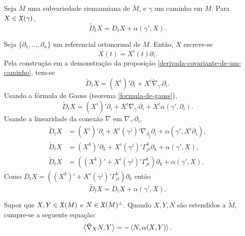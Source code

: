 \begin{proposicao}\label{formula-de-gauss-para-caminhos}
	Seja $M$ uma subvariedade riemanniana de $\tilde{M}$, e $\gamma$ um caminho em $M$. Para $X \in \mathfrak{X}(\gamma)$,
	\begin{equation*}
	\tilde{D}_t X = D_t X + \alpha(\gamma', X).
	\end{equation*}
\end{proposicao}

\begin{demonstracao}
	Seja $\{\partial_1, \ldots, \partial_n \}$ um referencial ortonormal de $M$. Então, $X$ escreve-se
	\begin{equation*}
	X(t) = X^i(t) \partial_i.
	\end{equation*}
	Pela construção em a demonstração da proposição \ref{derivada-covariante-de-um-caminho}, tem-se
	\begin{equation*}
	\tilde{D}_t X = (X^i)' \partial_i + X^i \tilde{\nabla}_{\gamma'} \partial_i.
	\end{equation*}
	Usando a fórmula de Gauss (teorema \ref{formula-de-gauss}),
	\begin{equation*}
	\tilde{D}_t X = (X^i)' \partial_i + X^i \nabla_{\gamma'} \partial_i + X^i \alpha(\gamma', \partial_i).
	\end{equation*}
	Usando a linearidade da conexão $\nabla$ em $\nabla_{\gamma'} \partial_i$,
	\begin{align*}
	\tilde{D}_t X &= (X^i)' \partial_i + X^i (\gamma^j)' \nabla_{\partial_j} \partial_i + \alpha(\gamma', X^i \partial_i),\\
	\tilde{D}_t X &= (X^k)' \partial_k + X^i (\gamma^j)' \Gamma_{ji}^k \partial_k + \alpha(\gamma', X),\\
	\tilde{D}_t X &=  \left((X^k)' + X^i (\gamma^j)' \Gamma_{ji}^k\right) \partial_k + \alpha(\gamma', X).
	\end{align*}
	Como $D_t X = \left((X^k)' + X^i (\gamma^j)' \Gamma_{ji}^k\right) \partial_k$ então
	\begin{equation*}
	\tilde{D}_t X = D_t X + \alpha(\gamma',X).
	\end{equation*}
\end{demonstracao}

\begin{lema}\label{equacao-de-weingarten}
	Supor que $X,Y \in \mathfrak{X}(M)$ e $N \in \mathfrak{X}(M)^\perp$. Quando $X,Y,N$ são estendidos a $\tilde{M}$, cumpre-se a seguente equação:
	\begin{equation*}
		\left\langle \tilde{\nabla}_X N,Y \right\rangle = -\left\langle N,\alpha(X,Y) \right\rangle.
	\end{equation*}
\end{lema}

